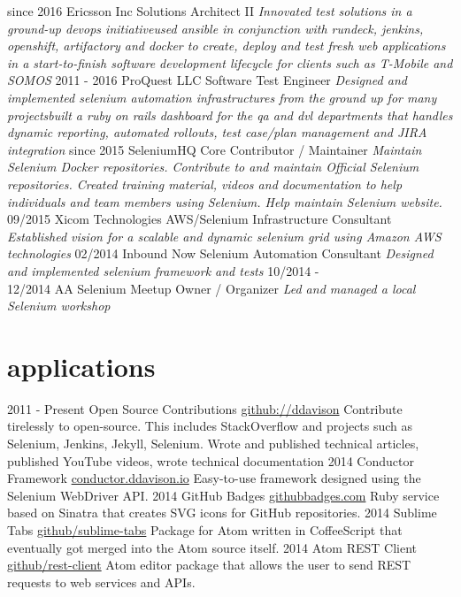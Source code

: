 \documentclass[]{ddavison-resume}
\begin{document}
\begin{entrylist}
  \entry
         {since 2016}
         {Ericsson Inc}
         {Solutions Architect II}
         {\emph{Innovated test solutions in a ground-up devops initiative\bullet used ansible in conjunction with rundeck, jenkins, openshift, artifactory and docker to create, deploy and test fresh web applications in a start-to-finish software development lifecycle for clients such as T-Mobile and SOMOS}}
  \entry
  	{2011 - 2016}
  	{ProQuest LLC}
  	{Software Test Engineer}
  	{\emph{Designed and implemented selenium automation infrastructures from the ground up for many projects\bullet built a ruby on rails dashboard for the qa and dvl departments that handles dynamic reporting, automated rollouts, test case/plan management and JIRA integration}} 
  \entry
  	{since 2015}
  	{SeleniumHQ}
  	{Core Contributor / Maintainer}
  	{\emph{Maintain Selenium Docker repositories.  Contribute to and maintain Official Selenium repositories. Created training material, videos and documentation to help individuals and team members using Selenium.  Help maintain Selenium website.}}
  \entry
  	{09/2015}
  	{Xicom Technologies}
  	{AWS/Selenium Infrastructure Consultant}
  	{\emph{Established vision for a scalable and dynamic selenium grid using Amazon AWS technologies}}
  \entry
  	{02/2014}
  	{Inbound Now}
  	{Selenium Automation Consultant}
  	{\emph{Designed and implemented selenium framework and tests}}
  \entry
  	{10/2014 - \\
  	12/2014}
  	{AA Selenium Meetup}
  	{Owner / Organizer}
  	{\emph{Led and managed a local Selenium workshop}}
\end{entrylist}

\section{applications}

\begin{entrylist}
  \entry
    {2011 - Present}
    {Open Source Contributions}
    {\href{https://github.com/ddavison}{github://ddavison}}
    {Contribute tirelessly to open-source.  This includes StackOverflow and projects such as Selenium, Jenkins, Jekyll, Selenium. Wrote and published technical articles, published YouTube videos, wrote technical documentation}
  \entry
    {2014}
    {Conductor Framework}
    {\href{https://conductor.ddavison.io}{conductor.ddavison.io}}
    {Easy-to-use framework designed using the Selenium WebDriver API.}
  \entry
    {2014}
    {GitHub Badges}
    {\href{https://github.com/ddavison/github-badges}{githubbadges.com}}
    {Ruby service based on Sinatra that creates SVG icons for GitHub repositories.}
  \entry
    {2014}
    {Sublime Tabs}
    {\href{https://github.com/ddavison/sublime-tabs}{github/sublime-tabs}}
    {Package for Atom written in CoffeeScript that eventually got merged into the Atom source itself.}
  \entry
  	{2014}
  	{Atom REST Client}
  	{\href{https://github.com/ddavison/rest-client}{github/rest-client}}
  	{Atom editor package that allows the user to send REST requests to web services and APIs.}
\end{entrylist}
\end{document}
